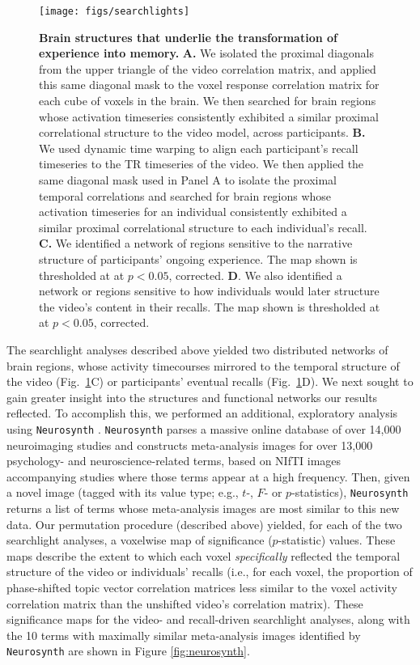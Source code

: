 \documentclass{article}
\begin{document}
\begin{figure}[t]
\centering
\texttt{[image: figs/searchlights]}
\caption{\small \textbf{Brain structures that underlie the transformation of experience into memory.} \textbf{A.} We isolated the proximal diagonals from the upper triangle of the video correlation matrix, and applied this same diagonal mask to the voxel response correlation matrix for each cube of voxels in the brain. We then searched for brain regions whose activation timeseries consistently exhibited a similar proximal correlational structure to the video model, across participants.  \textbf{B.} We used dynamic time warping \citep{BernClif94} to align each participant's recall timeseries to the TR timeseries of the video.  We then applied the same diagonal mask used in Panel A to isolate the proximal temporal correlations and searched for brain regions whose activation timeseries for an individual consistently exhibited a similar proximal correlational structure to each individual's recall.  \textbf{C.} We identified a network of regions sensitive to the narrative structure of participants' ongoing experience.  The map shown is thresholded at at $p < 0.05$, corrected.  \textbf{D}. We also identified a network or regions sensitive to how individuals would later structure the video's content in their recalls.  The map shown is thresholded at at $p < 0.05$, corrected.}
\label{fig:brainz}
\end{figure}

The searchlight analyses described above yielded two distributed networks of brain regions, whose activity timecourses mirrored to the temporal structure of the video (Fig.~\ref{fig:brainz}C) or participants' eventual recalls (Fig.~\ref{fig:brainz}D).  We next sought to gain greater insight into the structures and functional networks our results reflected.  To accomplish this,  we performed an additional, exploratory analysis using \texttt{Neurosynth} \citep{YarkEtal11}.  \texttt{Neurosynth} parses a massive online database of over 14,000 neuroimaging studies and constructs meta-analysis images for over 13,000 psychology- and neuroscience-related terms, based on NIfTI images accompanying studies where those terms appear at a high frequency.  Then, given a novel image (tagged with its value type; e.g., $t$-, $F$- or $p$-statistics), \texttt{Neurosynth} returns a list of terms whose meta-analysis images are most similar to this new data.  Our permutation procedure (described above) yielded, for each of the two searchlight analyses, a voxelwise map of significance ($p$-statistic) values.  These maps describe the extent to which each voxel \textit{specifically} reflected the temporal structure of the video or individuals' recalls (i.e., for each voxel, the proportion of phase-shifted topic vector correlation matrices less similar to the voxel activity correlation matrix than the unshifted video's correlation matrix).  These significance maps for the video- and recall-driven searchlight analyses, along with the 10 terms with maximally similar meta-analysis images identified by \texttt{Neurosynth} are shown in Figure \ref{fig:neurosynth}.
\end{document}
